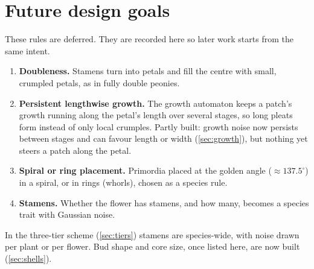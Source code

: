 \section{Future design goals}\label{sec:future}

These rules are deferred. They are recorded here so later work starts from the
same intent.

\begin{enumerate}[leftmargin=*]
\item \textbf{Doubleness.} Stamens turn into petals and fill the centre with
  small, crumpled petals, as in fully double peonies.
\item \textbf{Persistent lengthwise growth.} The growth automaton keeps a
  patch's growth running along the petal's length over several stages, so
  long pleats form instead of only local crumples. Partly built: growth noise
  now persists between stages and can favour length or width
  (\cref{sec:growth}), but nothing yet steers a patch along the petal.
\item \textbf{Spiral or ring placement.} Primordia placed at the golden angle
  ($\approx 137.5^\circ$) in a spiral, or in rings (whorls), chosen as a
  species rule.
\item \textbf{Stamens.} Whether the flower has stamens, and how many, becomes a
  species trait with Gaussian noise.
\end{enumerate}
In the three-tier scheme (\cref{sec:tiers}) stamens are species-wide, with
noise drawn per plant or per flower. Bud shape and core size, once listed here,
are now built (\cref{sec:shells}).
